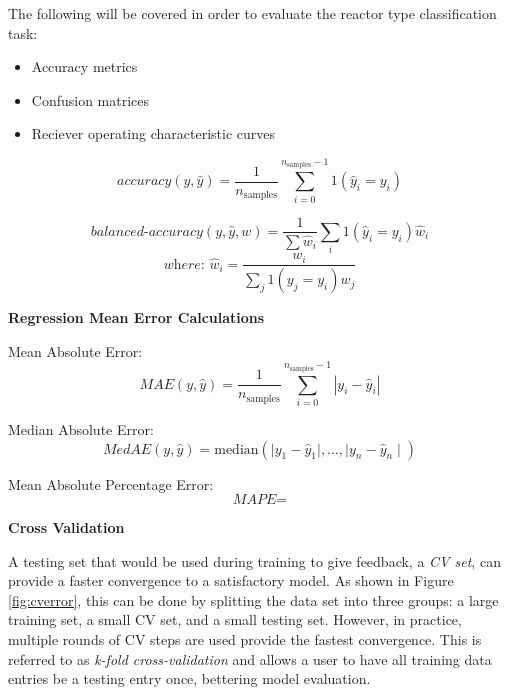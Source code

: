 The following will be covered in order to evaluate the reactor type
classification task:
\begin{itemize}
  \item Accuracy metrics
  \item Confusion matrices 
  \item Reciever operating characteristic curves
\end{itemize}

\begin{equation}
  \textit{accuracy}(y, \hat{y}) = \frac{1}{n_\text{samples}} \sum_{i=0}^{n_\text{samples}-1} 1(\hat{y}_i = y_i)
\end{equation}

\begin{equation}
  \textit{balanced-accuracy}(y, \hat{y}, w) = \frac{1}{\sum{\hat{w}_i}} \sum_i 1(\hat{y}_i = y_i) \hat{w}_i
\end{equation}
\[ \textit{where: } \hat{w}_i = \frac{w_i}{\sum_j{1(y_j = y_i) w_j}} \]

\noindent \textbf{Regression Mean Error Calculations}

Mean Absolute Error:
\begin{equation}
  \textit{MAE}(y, \hat{y}) = \frac{1}{n_{\text{samples}}} \sum_{i=0}^{n_{\text{samples}}-1} \left| y_i - \hat{y}_i \right|
\end{equation}

Median Absolute Error:
\begin{equation}
  \textit{MedAE}(y, \hat{y}) = \text{median}(\mid y_1 - \hat{y}_1 \mid, \ldots, \mid y_n - \hat{y}_n \mid)
\end{equation}

Mean Absolute Percentage Error:
\begin{equation}
  \textit{MAPE} = 
\end{equation}

\noindent \textbf{Cross Validation}

A testing set that would be used during training to give feedback, a
\textit{\gls{CV} set}, can provide a faster convergence to a satisfactory
model. As shown in Figure \ref{fig:cverror}, this can be done by splitting the
data set into three groups: a large training set, a small \gls{CV} set, and a
small testing set.  However, in practice, multiple rounds of \gls{CV} steps are
used provide the fastest convergence.  This is referred to as \textit{k-fold
cross-validation} and allows a user to have all training data entries be a
testing entry once, bettering model evaluation. 

